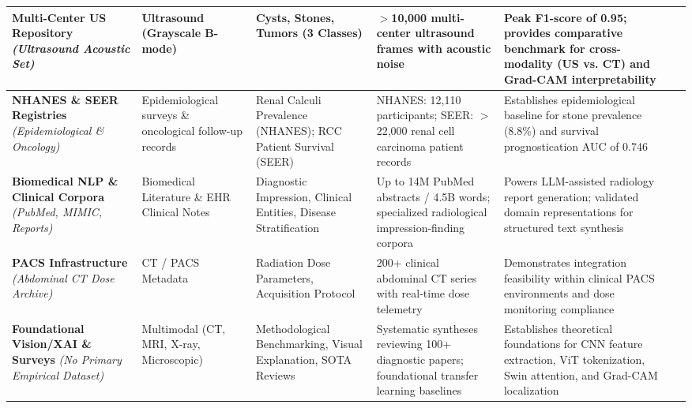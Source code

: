 \begin{small}
\begin{longtable}{p{2.5cm} p{2.0cm} p{2.5cm} p{3.0cm} p{3.6cm} p{2.2cm}}
\textbf{Multi-Center US Repository}\newline
\textit{(Ultrasound Acoustic Set)} & 
Ultrasound (Grayscale B-mode) & 
Cysts, Stones, Tumors (3 Classes) & 
$>$10,000 multi-center ultrasound frames with acoustic noise & 
Peak F1-score of 0.95; provides comparative benchmark for cross-modality (US vs. CT) and Grad-CAM interpretability & 
\cite{obaid2025noisy} \\
\midrule

\textbf{NHANES \& SEER Registries}\newline
\textit{(Epidemiological \& Oncology)} & 
Epidemiological surveys \& oncological follow-up records & 
Renal Calculi Prevalence (NHANES); RCC Patient Survival (SEER) & 
NHANES: 12,110 participants;\newline
SEER: $>$22,000 renal cell carcinoma patient records & 
Establishes epidemiological baseline for stone prevalence (8.8\%) and survival prognostication AUC of 0.746 & 
\cite{scales2012prevalence, wang2022web} \\
\midrule

\textbf{Biomedical NLP \& Clinical Corpora}\newline
\textit{(PubMed, MIMIC, Reports)} & 
Biomedical Literature \& EHR Clinical Notes & 
Diagnostic Impression, Clinical Entities, Disease Stratification & 
Up to 14M PubMed abstracts / 4.5B words; specialized radiological impression-finding corpora & 
Powers LLM-assisted radiology report generation; validated domain representations for structured text synthesis & 
\cite{gu2021domain, lee_biobert, fang2023bioformer, luo2022biogpt, liu2024bootstrapping} \\
\midrule

\textbf{PACS Infrastructure}\newline
\textit{(Abdominal CT Dose Archive)} & 
CT / PACS Metadata & 
Radiation Dose Parameters, Acquisition Protocol & 
200+ clinical abdominal CT series with real-time dose telemetry & 
Demonstrates integration feasibility within clinical PACS environments and dose monitoring compliance & 
\cite{noorelahi2025role} \\
\midrule

\textbf{Foundational Vision/XAI \& Surveys}\newline
\textit{(No Primary Empirical Dataset)} & 
Multimodal (CT, MRI, X-ray, Microscopic) & 
Methodological Benchmarking, Visual Explanation, SOTA Reviews & 
Systematic syntheses reviewing 100+ diagnostic papers; foundational transfer learning baselines & 
Establishes theoretical foundations for CNN feature extraction, ViT tokenization, Swin attention, and Grad-CAM localization & 
\cite{litjens2017survey, sloan2024automated, kumar2024comprehensive, aburass2025vision, lecun2015deep, kermany2018identifying, dosovitskiy2020image, liu2021swin, selvaraju2017grad, holzinger2019causability} \\

\end{longtable}
\end{small}
